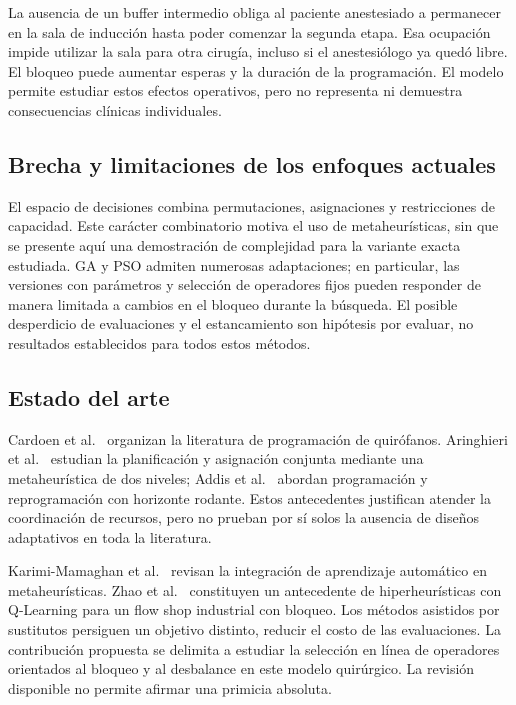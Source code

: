 \documentclass[11pt,a4paper]{article}
\begin{document}
La ausencia de un buffer intermedio obliga al paciente anestesiado a permanecer en la sala de inducción hasta poder comenzar la segunda etapa. Esa ocupación impide utilizar la sala para otra cirugía, incluso si el anestesiólogo ya quedó libre. El bloqueo puede aumentar esperas y la duración de la programación. El modelo permite estudiar estos efectos operativos, pero no representa ni demuestra consecuencias clínicas individuales.

\subsection*{Brecha y limitaciones de los enfoques actuales}
El espacio de decisiones combina permutaciones, asignaciones y restricciones de capacidad. Este carácter combinatorio motiva el uso de metaheurísticas, sin que se presente aquí una demostración de complejidad para la variante exacta estudiada. GA y PSO admiten numerosas adaptaciones; en particular, las versiones con parámetros y selección de operadores fijos pueden responder de manera limitada a cambios en el bloqueo durante la búsqueda. El posible desperdicio de evaluaciones y el estancamiento son hipótesis por evaluar, no resultados establecidos para todos estos métodos.

\subsection*{Estado del arte}
Cardoen et al.\ \cite{cardoen} organizan la literatura de programación de quirófanos. Aringhieri et al.\ \cite{aringhieri} estudian la planificación y asignación conjunta mediante una metaheurística de dos niveles; Addis et al.\ \cite{addis} abordan programación y reprogramación con horizonte rodante. Estos antecedentes justifican atender la coordinación de recursos, pero no prueban por sí solos la ausencia de diseños adaptativos en toda la literatura.

Karimi-Mamaghan et al.\ \cite{karimi} revisan la integración de aprendizaje automático en metaheurísticas. Zhao et al.\ \cite{zhao} constituyen un antecedente de hiperheurísticas con Q-Learning para un flow shop industrial con bloqueo. Los métodos asistidos por sustitutos \cite{jin} persiguen un objetivo distinto, reducir el costo de las evaluaciones. La contribución propuesta se delimita a estudiar la selección en línea de operadores orientados al bloqueo y al desbalance en este modelo quirúrgico. La revisión disponible no permite afirmar una primicia absoluta.
\end{document}
